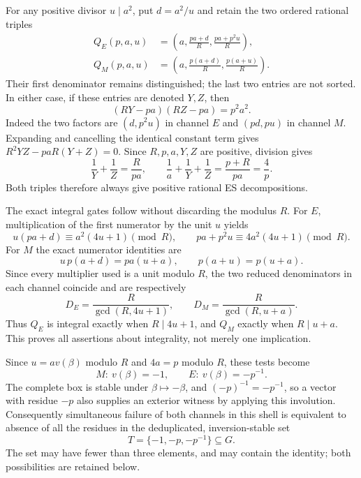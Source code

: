 For any positive divisor $u\mid a^2$, put $d=a^2/u$ and retain the two
ordered rational triples
\begin{align*}
 Q_E(p,a,u)&=\left(a,\frac{pa+d}{R},\frac{pa+p^2u}{R}\right),\\
 Q_M(p,a,u)&=\left(a,\frac{p(a+d)}{R},\frac{p(a+u)}{R}\right).
\end{align*}
Their first denominator remains distinguished; the last two entries are
not sorted. In either case, if these entries are denoted $Y,Z$, then
\[
 (RY-pa)(RZ-pa)=p^2a^2.
\]
Indeed the two factors are $(d,p^2u)$ in channel $E$ and $(pd,pu)$ in
channel $M$. Expanding and cancelling the identical constant term gives
$R^2YZ-paR(Y+Z)=0$. Since $R,p,a,Y,Z$ are positive, division gives
\[
 \frac1Y+\frac1Z=\frac{R}{pa},\qquad
 \frac1a+\frac1Y+\frac1Z=\frac{p+R}{pa}=\frac4p.
\]
Both triples therefore always give positive rational ES decompositions.

The exact integral gates follow without discarding the modulus $R$.
For $E$, multiplication of the first numerator by the unit $u$ yields
\[
 u(pa+d)\equiv a^2(4u+1)\pmod R,
 \qquad pa+p^2u\equiv4a^2(4u+1)\pmod R.
\]
For $M$ the exact numerator identities are
\[
 u\,p(a+d)=pa(u+a),\qquad p(a+u)=p(u+a).
\]
Since every multiplier used is a unit modulo $R$, the two reduced
denominators in each channel coincide and are respectively
\[
 D_E=\frac{R}{\gcd(R,4u+1)},\qquad
 D_M=\frac{R}{\gcd(R,u+a)}.
\]
Thus $Q_E$ is integral exactly when $R\mid4u+1$, and $Q_M$ exactly when
$R\mid u+a$. This proves all assertions about integrality, not merely
one implication.

Since $u=av(\beta)$ modulo $R$ and $4a=p$ modulo $R$, these tests become
\[
 M:\ v(\beta)=-1,
 \qquad E:\ v(\beta)=-p^{-1}.
\]
The complete box is stable under $\beta\mapsto-\beta$, and
$(-p)^{-1}=-p^{-1}$, so a vector with residue $-p$ also supplies an
exterior witness by applying this involution. Consequently simultaneous
failure of both channels in this shell is equivalent to absence of all
the residues in the deduplicated, inversion-stable set
\[
 T=\{-1,-p,-p^{-1}\}\subseteq G.
\]
The set may have fewer than three elements, and may contain the identity;
both possibilities are retained below.

